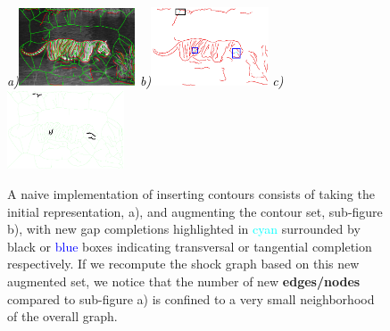 \begin{appendices}
\begin{figure}[!ht]
\centering
{\footnotesize\textit{\textcolor{black}{a)}}}\includegraphics[width=0.31\textwidth]{figs/tiger_lg_fig1.pdf}
{\footnotesize\textit{\textcolor{black}{b)}}}\includegraphics[width=0.31\textwidth]{figs/tiger_lg_fig2.pdf}
{\footnotesize\textit{\textcolor{black}{c)}}}\includegraphics[width=0.31\textwidth]{figs/tiger_lg_fig3.pdf}
\caption{A naive implementation of inserting contours consists of taking the initial representation, a), and augmenting the contour set, sub-figure b), with new gap completions highlighted in \textcolor{cyan}{cyan} surrounded by black or \textcolor{blue}{blue} boxes indicating transversal or tangential completion respectively. If we recompute the shock graph based on this new augmented set, we notice that the number of new {\bf edges/nodes} compared to sub-figure a) is confined to a very small neighborhood of the overall graph. } 
\label{fig:lcs_motivate}
\end{figure}


\end{appendices}

